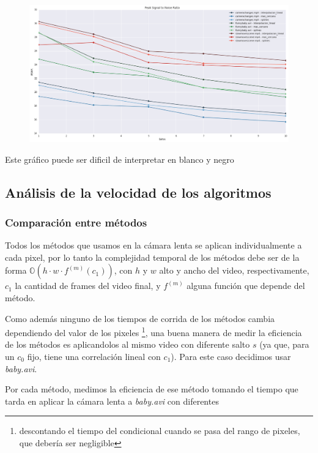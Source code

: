 \begin{figure}[H]
\centering
\includegraphics[width=.95\textwidth]{graficos/psnr.png}
\end{figure}
\vspace{-2em}
\begin{tiny}Este gr\'afico puede ser dificil de interpretar en blanco y negro\end{tiny}
\vspace{2em}

\subsection{An\'alisis de la velocidad de los algoritmos}

\subsubsection{Comparaci\'on entre m\'etodos}

Todos los m\'etodos que usamos en la c\'amara lenta se aplican individualmente a
cada pixel, por lo tanto la complejidad temporal de los m\'etodos debe ser de la
forma $ \mathbb{O}(h \cdot w \cdot f^{(m)}(c_1)) $, con $h$ y $w$ alto y ancho del
video, respectivamente, $c_1$ la cantidad de frames del video final, y $f^{(m)}$
alguna funci\'on que depende del m\'etodo.

Como adem\'as ninguno de los tiempos de corrida de los m\'etodos cambia
dependiendo del valor de los pixeles \footnote{descontando el tiempo del
condicional cuando se pasa del rango de pixeles, que deber\'ia ser negligible},
una buena manera de medir la eficiencia de los m\'etodos es aplicandolos al
mismo video con diferente salto $s$ (ya que, para un $c_0$ fijo, tiene una
correlaci\'on lineal con $c_1$). Para este caso decidimos usar
\textit{baby.avi}.

Por cada m\'etodo, medimos la eficiencia de ese m\'etodo tomando el tiempo que
tarda en aplicar la c\'amara lenta a \textit{baby.avi} con diferentes 

